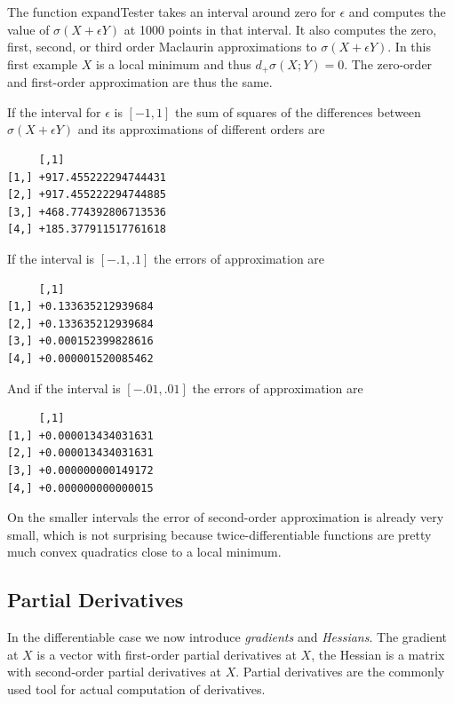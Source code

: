 \documentclass[
  12pt,
  letterpaper,
  DIV=11,
  numbers=noendperiod]{scrreprt}
\theoremstyle{remark}
\begin{document}
The function \textrm{expandTester} takes an interval around zero for
\(\epsilon\) and computes the value of \(\sigma(X+\epsilon Y)\) at 1000
points in that interval. It also computes the zero, first, second, or
third order Maclaurin approximations to \(\sigma(X+\epsilon Y)\). In
this first example \(X\) is a local minimum and thus
\(d_+\sigma(X;Y)=0\). The zero-order and first-order approximation are
thus the same.

If the interval for \(\epsilon\) is \([-1,1]\) the sum of squares of the
differences between \(\sigma(X+\epsilon Y)\) and its approximations of
different orders are

\begin{verbatim}
     [,1]                
[1,] +917.455222294744431
[2,] +917.455222294744885
[3,] +468.774392806713536
[4,] +185.377911517761618
\end{verbatim}

If the interval is \([-.1,.1]\) the errors of approximation are

\begin{verbatim}
     [,1]              
[1,] +0.133635212939684
[2,] +0.133635212939684
[3,] +0.000152399828616
[4,] +0.000001520085462
\end{verbatim}

And if the interval is \([-.01,.01]\) the errors of approximation are

\begin{verbatim}
     [,1]              
[1,] +0.000013434031631
[2,] +0.000013434031631
[3,] +0.000000000149172
[4,] +0.000000000000015
\end{verbatim}

On the smaller intervals the error of second-order approximation is
already very small, which is not surprising because twice-differentiable
functions are pretty much convex quadratics close to a local minimum.

\subsection{Partial Derivatives}\label{partial-derivatives}

In the differentiable case we now introduce \emph{gradients} and
\emph{Hessians}. The gradient at \(X\) is a vector with first-order
partial derivatives at \(X\), the Hessian is a matrix with second-order
partial derivatives at \(X\). Partial derivatives are the commonly used
tool for actual computation of derivatives.
\end{document}
